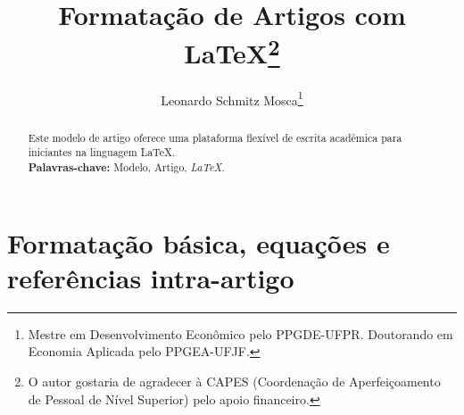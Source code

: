 \documentclass[a4paper]{article} %
\title{Formatação de Artigos com \LaTeX\thanks{O autor gostaria de agradecer à CAPES (Coordenação de Aperfeiçoamento de Pessoal de Nível Superior) pelo apoio financeiro.}}
\author{Leonardo Schmitz Mosca\thanks{Mestre em Desenvolvimento Econômico pelo PPGDE-UFPR. Doutorando em Economia Aplicada pelo PPGEA-UFJF.}}
\begin{document}
	\maketitle
	\begin{abstract}
		\noindent %
		Este modelo de artigo oferece uma plataforma flexível de escrita acadêmica para iniciantes na linguagem \LaTeX. \\ %
		\textbf{Palavras-chave:} Modelo, Artigo, \textit{LaTeX}.
	\end{abstract}
\vspace{15cm}
\pagebreak %

\tableofcontents %
\pagebreak
\section{Formatação básica, equações e referências intra-artigo} \label{S1}
\end{document}
